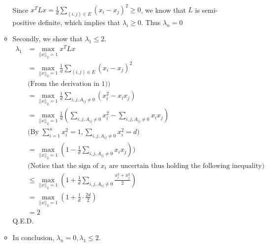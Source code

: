 \documentclass[english,onecolumn]{IEEEtran}
\begin{document}
\begin{enumerate}
\begin{itemize}
\begin{align*}
    		\end{align*}
    		Since $x^TLx = \frac{1}{d} \sum_{(i,j)\in E} (x_i-x_j)^2 \ge 0$, we know that $L$ is semi-positive definite, which implies that $\lambda_i \ge 0$. Thus $\lambda_n = 0$
    	\item Secondly, we show that $\lambda_1 \le 2$. 
    	\begin{align*}
    		\lambda_1 &= \max\limits_{||x||_2=1} x^TLx\\
    		& =  \max\limits_{||x||_2=1} \frac{1}{d}\sum_{(i,j)\in E} (x_i-x_j)^2\\
    		&\text{(From the derivation in 1))}\\
    		& = \max\limits_{||x||_2=1} \frac{1}{d}\sum_{i,j,A_{ij}\ne 0} (x_i^2 - x_ix_j)\\
    		& = \max \limits_{||x||_2=1} \frac{1}{d}(\sum_{i,j,A_{ij}\ne 0} x_i^2 - \sum_{i,j,A_{ij}\ne 0} x_ix_j)\\
    		&\text{(By $\sum_{i=1}^n x_i^2 = 1, \sum_{i,j,A_{ij}\ne 0} x_i^2 = d$)}\\
    		& = \max \limits_{||x||_2=1} (1 - \frac{1}{d}\sum_{i,j,A_{ij}\ne 0} x_ix_j))\\
    		&\text{(Notice that the sign of $x_i$ are uncertain thus holding the following inequality)}\\
    		& \le \max \limits_{||x||_2=1} (1 + \frac{1}{d} \sum_{i,j,A_{ij}\ne 0} \frac{x_i^2+x_j^2}{2})\\
    		& = \max \limits_{||x||_2=1} (1 + \frac{1}{d} \cdot \frac{2d}{2})\\
    		& = 2
    	\end{align*}
    	Q.E.D.
    	\item In conclusion, $\lambda_n = 0, \lambda_1 \le 2$.
    \end{itemize}
    	

\end{enumerate}
\end{document}
